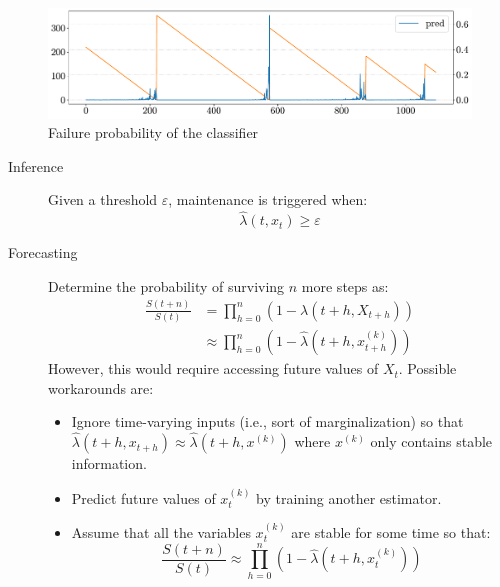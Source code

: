 \begin{figure}[H]
    \centering
    \includegraphics[width=0.9\linewidth]{./img/_rul_survival_analysis_classifier.pdf}
    \caption{Failure probability of the classifier}
\end{figure}

\begin{description}
    \item[Inference] \phantom{}
        Given a threshold $\varepsilon$, maintenance is triggered when:
        \[ \hat{\lambda}(t, x_t) \geq \varepsilon \]

    \item[Forecasting] 
        Determine the probability of surviving $n$ more steps as:
        \[ 
            \begin{split}
                \frac{S(t+n)}{S(t)} &= \prod_{h=0}^{n} (1 - \lambda(t+h, X_{t+h})) \\
                &\approx \prod_{h=0}^{n} (1 - \hat{\lambda}(t+h, x^{(k)}_{t+h}))
            \end{split}
        \]
        However, this would require accessing future values of $X_t$. Possible workarounds are:
        \begin{itemize}
            \item Ignore time-varying inputs (i.e., sort of marginalization) so that $\hat{\lambda}(t+h, x_{t+h}) \approx \hat{\lambda}(t+h, x^{(k)})$ where $x^{(k)}$ only contains stable information.
            \item Predict future values of $x^{(k)}_t$ by training another estimator.
            \item Assume that all the variables $x^{(k)}_t$ are stable for some time so that:
            \[ \frac{S(t+n)}{S(t)} \approx \prod_{h=0}^{n} (1 - \hat{\lambda}(t+h, x^{(k)}_{t})) \]
        \end{itemize}
\end{description}
